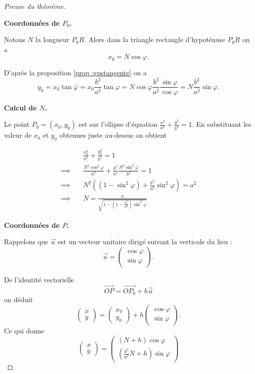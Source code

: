 \documentclass[class=report,crop=false]{standalone}
\newcommand{\vect}{\overrightarrow}
\begin{document}
\begin{proof}[Preuve du théorème]~

\textbf{Coordonnées de $P_0$.}  

Notons $N$ la longueur $P_0R$.
Alors dans la triangle rectangle d'hypoténuse $P_0R$ on a 
$$x_0 = N \cos \varphi.$$

D'après la proposition \ref{prop :gpstangente} on a
$$y_0 = x_0 \tan \bar\varphi = x_0 \frac{b^2}{a^2} \tan \varphi 
= N \cos \varphi\frac{b^2}{a^2} \frac{\sin\varphi}{\cos \varphi} = N\frac{b^2}{a^2}\sin\varphi.$$


\textbf{Calcul de $N$.}   

Le point $P_0 = (x_0,y_0)$ est sur l'ellipse d'équation 
$\frac{x^2}{a^2}+\frac{y^2}{b^2} = 1$.
En substituant les valeur de $x_0$ et $y_0$ obtenues juste au-dessus on obtient

\begin{align*}
         & \quad \frac{x_0^2}{a^2}+\frac{y_0^2}{b^2} = 1 \\
\implies & \quad \frac{N^2 \cos^2 \varphi}{a^2}+\frac{b^4}{a^4}\frac{N^2 \sin^2 \varphi}{b^2} = 1 \\
\implies & \quad N^2 \left( (1-\sin^2\varphi) + \frac{b^2}{a^2}\sin^2 \varphi \right) = a^2 \\
\implies & \quad N = \frac{a}{\sqrt{1-\left(1-\frac{b^2}{a^2}\right)\sin^2 \varphi}}
\end{align*}

\textbf{Coordonnées de $P$.} 

Rappelons que $\vect u$ est un vecteur unitaire dirigé suivant la verticale du lieu :
$$ \vect{u} = \begin{pmatrix}\cos \varphi \\ \sin \varphi \end{pmatrix}.$$

De l'identité vectorielle 
$$\vect{OP} = \vect{OP_0} + h \vect{u}$$
on déduit 
$$\begin{pmatrix}x\\y\end{pmatrix}
= \begin{pmatrix}x_0\\y_0\end{pmatrix} + h \begin{pmatrix}\cos \varphi \\ \sin \varphi \end{pmatrix}.$$
Ce qui donne
$$\begin{pmatrix}x\\y\end{pmatrix}
= \begin{pmatrix}(N+h) \cos \varphi \\ 
  \left(\frac{b^2}{a^2}N+h\right)\sin\varphi  
  \end{pmatrix}$$

\end{proof}
\end{document}
